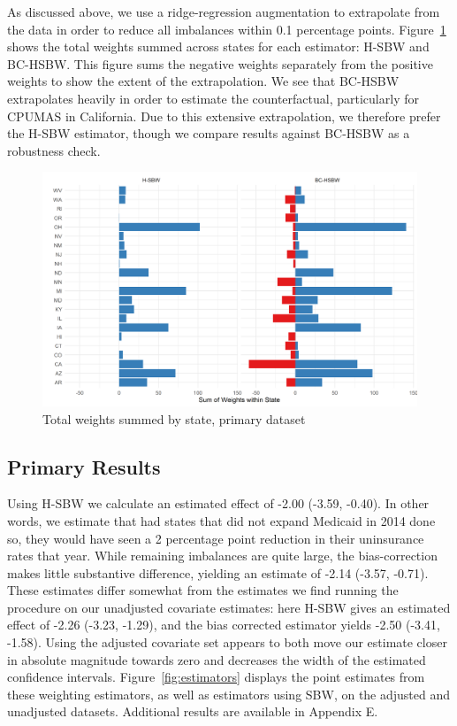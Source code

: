 \documentclass{article}
\begin{document}
As discussed above, we use a ridge-regression augmentation to extrapolate from the data in order to reduce all imbalances within 0.1 percentage points. Figure~\ref{fig:statewghts} shows the total weights summed across states for each estimator: H-SBW and BC-HSBW. This figure sums the negative weights separately from the positive weights to show the extent of the extrapolation. We see that BC-HSBW extrapolates heavily in order to estimate the counterfactual, particularly for CPUMAS in California. Due to this extensive extrapolation, we therefore prefer the H-SBW estimator, though we compare results against BC-HSBW as a robustness check.

\begin{figure}[B]
\begin{center}
    \caption{Total weights summed by state, primary dataset}
    \label{fig:statewghts}
    \includegraphics[scale=0.6]{01_Plots/weights-by-state-hsbw-c1.png}
\end{center}
\end{figure}

\subsection{Primary Results}

Using H-SBW we calculate an estimated effect of -2.00 (-3.59, -0.40). In other words, we estimate that had states that did not expand Medicaid in 2014 done so, they would have seen a 2 percentage point reduction in their uninsurance rates that year. While remaining imbalances are quite large, the bias-correction makes little substantive difference, yielding an estimate of -2.14 (-3.57, -0.71). These estimates differ somewhat from the estimates we find running the procedure on our unadjusted covariate estimates: here H-SBW gives an estimated effect of -2.26 (-3.23, -1.29), and the bias corrected estimator yields -2.50 (-3.41, -1.58). Using the adjusted covariate set appears to both move our estimate closer in absolute magnitude towards zero and decreases the width of the estimated confidence intervals. Figure~\ref{fig:estimators} displays the point estimates from these weighting estimators, as well as estimators using SBW, on the adjusted and unadjusted datasets. Additional results are available in Appendix E.
\end{document}
